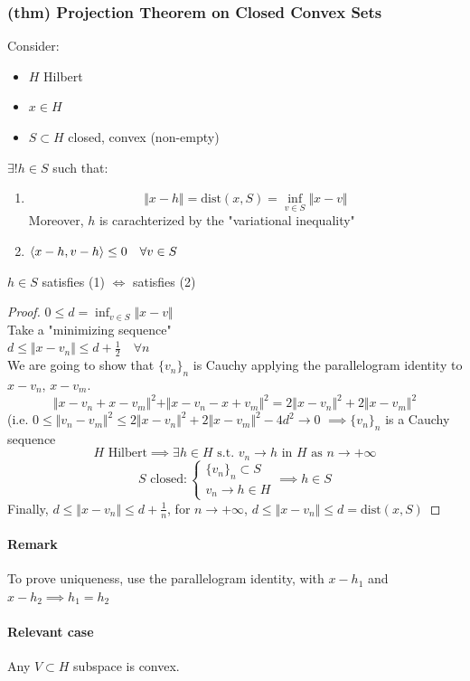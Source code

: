 \subsubsection{(thm) Projection Theorem on Closed Convex Sets}
Consider:
\begin{itemize}
    \item $H$ Hilbert
    \item $x\in H$
    \item $S\subset H$ closed, convex (non-empty)
\end{itemize}
$\exists ! h\in S$ such that:
\begin{enumerate}
    \item $$\Vert x-h\Vert =\mathrm{dist}(x,S)=\inf_{v\in S}\Vert x-v\Vert $$
    Moreover, $h$ is carachterized by the "variational inequality"
    \item $\langle {x-h} , {v-h} \rangle\leq 0\quad \forall v\in S$
\end{enumerate}
$h\in S$ satisfies (1) $\iff $ satisfies (2)
\begin{proof}
    $0\leq d=\inf_{v\in S} \Vert x-v\Vert$\\
    Take a "minimizing sequence"\\
    $d\leq \Vert x-v_n\Vert \leq d+\frac 12\quad \forall n$
    \\
    We are going to show that $\{v_n\}_n$ is Cauchy applying the parallelogram identity to $x-v_n$, $x-v_m$.
    $$\Vert x-v_n+x-v_m\Vert ^2+\Vert x-v_n-x+v_m\Vert ^2=2\Vert x-v_n\Vert ^2+2\Vert x-v_m\Vert ^2$$
    (i.e. $0\leq\Vert v_n-v_m\Vert ^2 \leq 2\Vert x-v_n\Vert ^2+2\Vert x-v_m\Vert ^2-4d^2\to 0$
    $\implies \{v_n\}_n$ is a Cauchy sequence\\
    $$H \text{ Hilbert} \implies \exists h\in H\text{ s.t. } v_n\to h \text { in }H \text{ as }n \to +\infty$$
    $$S \text{ closed}: \begin{cases}
        \{v_n\}_n\subset S\\ v_n\to h \in H
    \end{cases}\implies h\in S$$
    Finally, $d\leq \Vert x-v_n\Vert \leq d+\frac 1n$, for $n\to+\infty$, $d\leq \Vert x-v_n\Vert \leq d=\mathrm{dist}(x,S)$
\end{proof}
\paragraph{Remark}
To prove uniqueness, use the parallelogram identity, with $x-h_1$ and $x-h_2\implies h_1=h_2$
\paragraph{Relevant case} Any $V\subset H$ subspace is convex.
